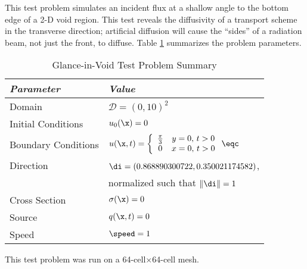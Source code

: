This test problem simulates an incident flux at a shallow angle to
the bottom edge of a 2-D void region.
This test reveals the diffusivity of a transport scheme in the transverse
direction; artificial diffusion will cause the ``sides'' of a radiation beam,
not just the front, to diffuse.
Table \ref{tab:glance_in_void} summarizes the problem parameters.

\begin{table}[htb]\caption{Glance-in-Void Test Problem Summary}
\label{tab:glance_in_void}
\centering
\begin{tabular}{l l}\toprule
\emph{Parameter} & \emph{Value}\\\midrule
Domain & $\mathcal{D} = (0,10)^2$\\
Initial Conditions & $u_0(\x)=0$\\
Boundary Conditions & $u(\x,t)=\left\{\begin{array}{c c}
  \frac{\pi}{3} & y = 0, \, t > 0\\
  0             & x = 0, \, t > 0
  \end{array}\right. \eqc$\\
Direction & $\di = (0.868890300722,0.350021174582)$,\\
          & normalized such that $\|\di\| = 1$\\
Cross Section & $\sigma(\x)=0$\\
Source & $q(\x,t)=0$\\
Speed & $\speed=1$\\
\bottomrule\end{tabular}
\end{table}

This test problem was run on a 64-cell$\times$64-cell mesh.




